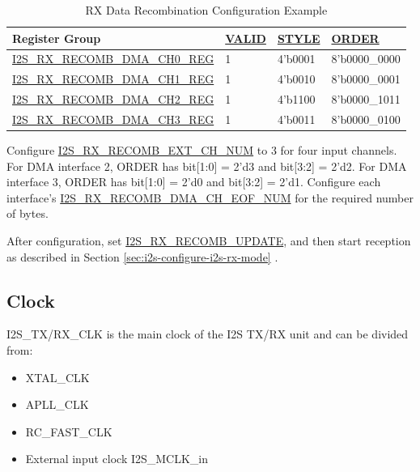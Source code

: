 \documentclass[main\_\_EN.tex]{subfiles}
\begin{document}
\begin{table}[H]
    \centering
    \caption{RX Data Recombination Configuration Example}
    \label{tab:i2s-rx-recomb-example}
    \begin{tabular}{|p{6cm}|R{2.0cm}|R{2.6cm}|R{3.0cm}|}
    \hline
    \textbf{Register Group} & \textbf{\hyperref[fielddesc:I2SRXRECOMBDMACH0VALID]{VALID}} & \textbf{\hyperref[fielddesc:I2SRXRECOMBDMACH0STYLE]{STYLE}} & \textbf{\hyperref[fielddesc:I2SRXRECOMBDMACH0ORDER]{ORDER}}\\ \hline
    \hyperref[regdesc:I2SRXRECOMBDMACH0REG]{I2S\_RX\_RECOMB\_DMA\_CH0\_REG} & 1 & 4'b0001 & 8'b0000\_0000 \\\hline
    \hyperref[regdesc:I2SRXRECOMBDMACH1REG]{I2S\_RX\_RECOMB\_DMA\_CH1\_REG} & 1 & 4'b0010 & 8'b0000\_0001 \\\hline
    \hyperref[regdesc:I2SRXRECOMBDMACH2REG]{I2S\_RX\_RECOMB\_DMA\_CH2\_REG} & 1 & 4'b1100 & 8'b0000\_1011 \\\hline
    \hyperref[regdesc:I2SRXRECOMBDMACH3REG]{I2S\_RX\_RECOMB\_DMA\_CH3\_REG} & 1 & 4'b0011 & 8'b0000\_0100 \\\hline
    \end{tabular}
\end{table}

Configure \hyperref[fielddesc:I2SRXRECOMBEXTCHNUM]{I2S\_RX\_RECOMB\_EXT\_CH\_NUM} to 3 for four input channels. For DMA interface 2, ORDER has bit[1:0] = 2'd3 and bit[3:2] = 2'd2. For DMA interface 3, ORDER has bit[1:0] = 2'd0 and bit[3:2] = 2'd1. Configure each interface's \hyperref[fielddesc:I2SRXRECOMBDMACH0EOFNUM]{I2S\_RX\_RECOMB\_DMA\_CH\_EOF\_NUM} for the required number of bytes.

After configuration, set \hyperref[fielddesc:I2SRXRECOMBUPDATE]{I2S\_RX\_RECOMB\_UPDATE}, and then start reception as described in Section \ref{sec:i2s-configure-i2s-rx-mode} \textit{}.

\subsection{Clock}\label{sec:i2s-tx-rx-clk}

I2S\_TX/RX\_CLK is the main clock of the I2S TX/RX unit and can be divided from:
\begin{itemize}
    \item XTAL\_CLK
    \item APLL\_CLK
    \item RC\_FAST\_CLK
    \item External input clock I2S\_MCLK\_in
\end{itemize}
\end{document}

